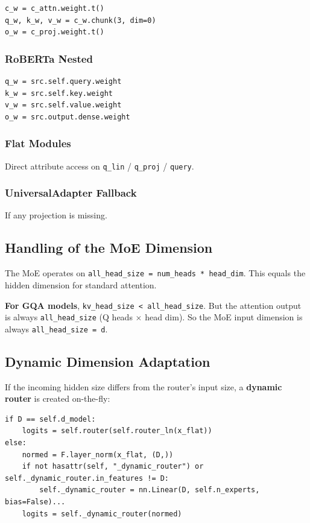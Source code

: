 \begin{lstlisting}
c_w = c_attn.weight.t()
q_w, k_w, v_w = c_w.chunk(3, dim=0)
o_w = c_proj.weight.t()
\end{lstlisting}

\subsubsection{RoBERTa Nested}

\begin{lstlisting}
q_w = src.self.query.weight
k_w = src.self.key.weight
v_w = src.self.value.weight
o_w = src.output.dense.weight
\end{lstlisting}

\subsubsection{Flat Modules}

Direct attribute access on \texttt{q\_lin} / \texttt{q\_proj} / \texttt{query}.

\subsubsection{UniversalAdapter Fallback}

If any projection is missing.

\subsection{Handling of the MoE Dimension}

The MoE operates on \texttt{all\_head\_size = num\_heads * head\_dim}. This equals the 
hidden dimension for standard attention.

\textbf{For GQA models}, \texttt{kv\_head\_size < all\_head\_size}. But the attention output 
is always \texttt{all\_head\_size} (Q heads $\times$ head dim). So the MoE input dimension 
is always \texttt{all\_head\_size = d}.

\subsection{Dynamic Dimension Adaptation}

If the incoming hidden size differs from the router's input size, a 
\textbf{dynamic router} is created on-the-fly:

\begin{lstlisting}
if D == self.d_model:
    logits = self.router(self.router_ln(x_flat))
else:
    normed = F.layer_norm(x_flat, (D,))
    if not hasattr(self, "_dynamic_router") or self._dynamic_router.in_features != D:
        self._dynamic_router = nn.Linear(D, self.n_experts, bias=False)...
    logits = self._dynamic_router(normed)
\end{lstlisting}

